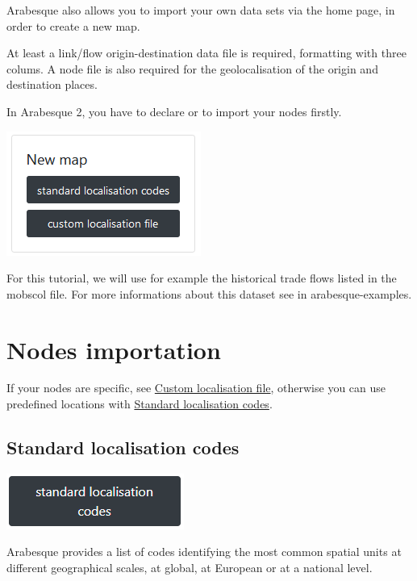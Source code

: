 \documentclass[
  letterpaper,
  DIV=11,
  numbers=noendperiod]{scrreprt}
\begin{document}
Arabesque also allows you to import your own data sets via the home
page, in order to create a new map.

At least a link/flow origin-destination data file is required,
formatting with three colums. A node file is also required for the
geolocalisation of the origin and destination places.

In Arabesque 2, you have to declare or to import your nodes firstly.

\includegraphics{images/Arabesque_homepage_newmap.png}

For this tutorial, we will use for example the historical trade flows
listed in the mobscol file. For more informations about this dataset see
in arabesque-examples.

\section{Nodes importation}\label{nodes-importation}

If your nodes are specific, see
\hyperref[custom-localisation-file]{Custom localisation file}, otherwise
you can use predefined locations with
\hyperref[standard-localisation-codes]{Standard localisation codes}.

\subsection{Standard localisation
codes}\label{standard-localisation-codes}

\begin{center}
\includegraphics{images/Nodes_import_standard.PNG}
\end{center}

Arabesque provides a list of codes identifying the most common spatial
units at different geographical scales, at global, at European or at a
national level.
\end{document}
